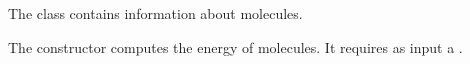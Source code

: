 

The  class contains information about molecules.

The   constructor computes the
energy of molecules.  It requires as input a
.
